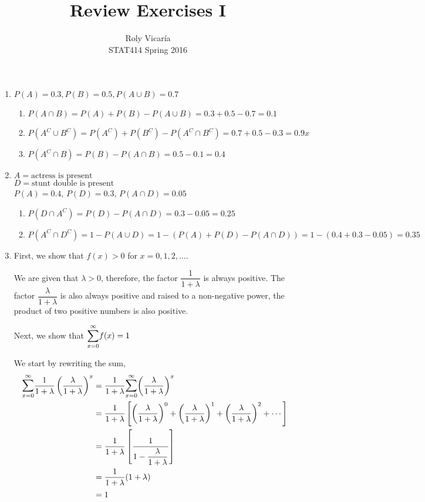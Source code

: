 \documentclass{article}
\title{Review Exercises I}
\author{Roly Vicar\'ia \\ STAT414 Spring 2016}
\newcommand\mfrac[2]{\left(\dfrac{#1}{#2}\right)}
\newcommand\lsum{\mathlarger{\sum}}
\begin{document}
    
    \maketitle
    
    \begin{enumerate}
     \item
      $P(A) = 0.3, P(B) = 0.5, P(A \cup B) = 0.7$
      \begin{enumerate}
	\item
	 $P(A \cap B) = P(A) + P(B) - P(A \cup B) = 0.3 + 0.5 - 0.7 = 0.1$
	 
	\item
	 $P(A^C \cup B^C) = P(A^C) + P(B^C) - P(A^C \cap B^C) = 0.7 + 0.5 - 0.3 = 0.9x$
	 
	\item
	 $P(A^C \cap B) = P(B) - P(A \cap B) = 0.5 - 0.1 = 0.4$
      \end{enumerate}
     
     \item 
      $A = \text{actress is present}$ \\
      $D = \text{stunt double is present}$ \\
      $P(A) = 0.4$, $P(D) = 0.3$, $P(A \cap D) = 0.05$
      \begin{enumerate}
       \item 
	$P(D \cap A^C) = P(D) - P(A \cap D) = 0.3 - 0.05 = 0.25$
       
       \item
	$P(A^C \cap D^C) = 1 - P(A \cup D) = 1 - (P(A) + P(D) - P(A \cap D)) = 1 - (0.4 + 0.3 - 0.05)
	  = 0.35$
      \end{enumerate}
     
     \item
      First, we show that $f(x) > 0$ for $x=0,1,2,\dots$.
      
      We are given that $\lambda > 0$, therefore, the factor $\dfrac{1}{1+\lambda}$
      is always positive. The factor $\dfrac{\lambda}{1+\lambda}$ is also always positive and raised
      to a non-negative power, the product of two positive numbers is also positive. 
      
      Next, we show that $\lsum_{x=0}^{\infty} {f(x)} = 1$
      
      We start by rewriting the sum,
      \begin{align*}
	\lsum_{x=0}^{\infty}{\dfrac{1}{1+\lambda} \mfrac{\lambda}{1+\lambda}^x} 
	      &= \dfrac{1}{1+\lambda} \lsum_{x=0}^{\infty}{\mfrac{\lambda}{1+\lambda}^x} \\
	&= \dfrac{1}{1+\lambda} \left[ \mfrac{\lambda}{1+\lambda}^0 + \mfrac{\lambda}{1+\lambda}^1
	      + \mfrac{\lambda}{1+\lambda}^2 + \cdots \right] \\
	&= \dfrac{1}{1+\lambda} \left[ \dfrac{1}{1 - \dfrac{\lambda}{1+\lambda}} \right] \\
	&= \dfrac{1}{1+\lambda} (1 + \lambda) \\
	&= 1
      \end{align*}
      

\end{enumerate}
\end{document}
